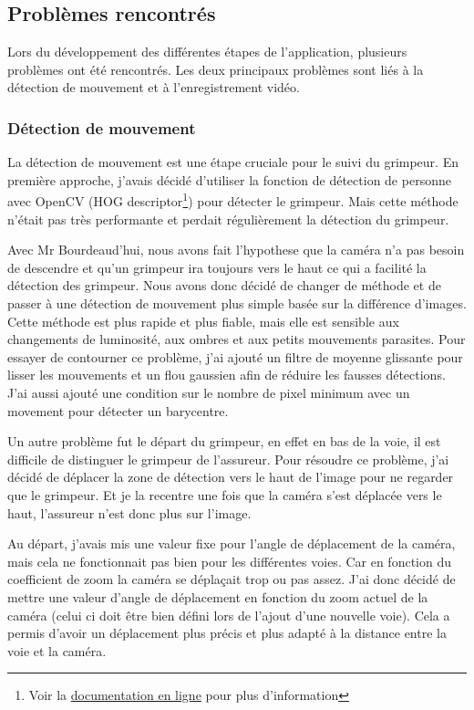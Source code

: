 \documentclass[a4paper, 11pt, french]{article}
\begin{document}

\subsection{Problèmes rencontrés}
Lors du développement des différentes étapes de l'application, plusieurs problèmes ont été rencontrés. Les deux principaux problèmes sont liés à la détection de mouvement et à l'enregistrement vidéo.

\subsubsection{Détection de mouvement}
La détection de mouvement est une étape cruciale pour le suivi du grimpeur. En première approche, j'avais décidé d'utiliser la fonction de détection de personne avec OpenCV (HOG descriptor\footnote{Voir la \href{https://docs.opencv.org/3.4/d5/d33/structcv_1_1HOGDescriptor.html}{documentation en ligne} pour plus d'information}) pour détecter le grimpeur. Mais cette méthode n'était pas très performante et perdait régulièrement la détection du grimpeur. 

Avec Mr Bourdeaud'hui, nous avons fait l'hypothese que la caméra n'a pas besoin de descendre et qu'un grimpeur ira toujours vers le haut ce qui a facilité la détection des grimpeur. Nous avons donc décidé de changer de méthode et de passer à une détection de mouvement plus simple basée sur la différence d'images. Cette méthode est plus rapide et plus fiable, mais elle est sensible aux changements de luminosité, aux ombres et aux petits mouvements parasites. Pour essayer de contourner ce problème, j'ai ajouté un filtre de moyenne glissante pour lisser les mouvements et un flou gaussien afin de réduire les fausses détections. J'ai aussi ajouté une condition sur le nombre de pixel minimum avec un movement pour détecter un barycentre.

Un autre problème fut le départ du grimpeur, en effet en bas de la voie, il est difficile de distinguer le grimpeur de l'assureur. Pour résoudre ce problème, j'ai décidé de déplacer la zone de détection vers le haut de l'image pour ne regarder que le grimpeur. Et je la recentre une fois que la caméra s'est déplacée vers le haut, l'assureur n'est donc plus sur l'image.

Au départ, j'avais mis une valeur fixe pour l'angle de déplacement de la caméra, mais cela ne fonctionnait pas bien pour les différentes voies. Car en fonction du coefficient de zoom la caméra se déplaçait trop ou pas assez. J'ai donc décidé de mettre une valeur d'angle de déplacement en fonction du zoom actuel de la caméra (celui ci doit être bien défini lors de l'ajout d'une nouvelle voie). Cela a permis d'avoir un déplacement plus précis et plus adapté à la distance entre la voie et la caméra.
\end{document}
